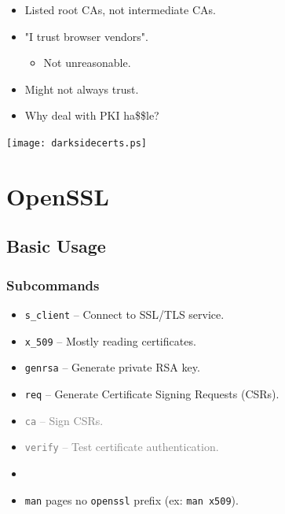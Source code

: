 \documentclass[xcolor={dvipsnames,svgnames},hyperref=dvips]{beamer}
\begin{document}
	\begin{frame}
		\begin{itemize}
		\item Listed root CAs, not intermediate CAs.
		\item "I trust browser vendors".
		\begin{itemize}
			\item Not unreasonable.
		\end{itemize}
		\item Might not always trust.
		\item Why deal with PKI ha\$\$le?
		\end{itemize}
	\end{frame}

	\begin{frame}
		\center\texttt{[image: darksidecerts.ps]}
	\end{frame}

\section{OpenSSL}
\subsection{Basic Usage}
	\begin{frame}
		\frametitle{Subcommands}
		\begin{itemize}
			\item \texttt{s\_client} -- Connect to SSL/TLS service.
			\item \texttt{x\_509} -- Mostly reading certificates.
			\item \texttt{genrsa} -- Generate private RSA key.
			\item \texttt{req} -- Generate Certificate Signing Requests (CSRs).
			\item \textcolor{gray}{\texttt{ca} -- Sign CSRs.}
			\item \textcolor{gray}{\texttt{verify} -- Test certificate authentication.}
			\item[]
			\item \texttt{man} pages no \texttt{openssl} prefix (ex: \texttt{man x509}).
		\end{itemize}
	\end{frame}
\end{document}
